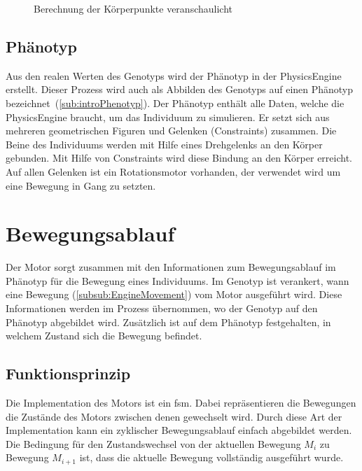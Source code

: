         \begin{figure}[H]
          \centering
          
          \caption{Berechnung der Körperpunkte veranschaulicht\label{fig:kp}}
        \end{figure}

    \subsection{Phänotyp\label{sub:Phenotyp}}

      Aus den realen Werten des Genotyps wird der Phänotyp in der \gls{PhysicsEngine} erstellt.
      Dieser Prozess wird auch als Abbilden des Genotyps auf einen Phänotyp bezeichnet~(\vref{sub:introPhenotyp}).
      Der Phänotyp enthält alle Daten, welche die \gls{PhysicsEngine} braucht, um das Individuum zu simulieren.
      Er setzt sich aus mehreren geometrischen Figuren und Gelenken (\Glspl{Constraint}) zusammen.
      Die Beine des Individuums werden mit Hilfe eines Drehgelenks an den Körper gebunden.
      Mit Hilfe von Constraints wird diese Bindung an den Körper erreicht.
      Auf allen Gelenken ist ein Rotationsmotor vorhanden, der verwendet wird um eine Bewegung in Gang zu setzten.

  \section{Bewegungsablauf\label{sec:Engine}}

    Der Motor sorgt zusammen mit den Informationen zum Bewegungsablauf im Phänotyp für die Bewegung eines Individuums.
    Im Genotyp ist verankert, wann eine Bewegung (\vref{subsub:EngineMovement}) vom Motor ausgeführt wird.
    Diese Informationen werden im Prozess übernommen, wo der Genotyp auf den Phänotyp abgebildet wird.
    Zusätzlich ist auf dem Phänotyp festgehalten, in welchem Zustand sich die Bewegung befindet.

    \subsection{Funktionsprinzip}

      Die Implementation des Motors ist ein \acrfull{fsm}.
      Dabei repräsentieren die Bewegungen die Zustände des Motors zwischen denen gewechselt wird.
      Durch diese Art der Implementation kann ein zyklischer Bewegungsablauf einfach abgebildet werden.
      Die Bedingung für den Zustandswechsel von der aktuellen Bewegung \( M_{i} \) zu Bewegung \( M_{i + 1} \) ist,
      dass die aktuelle Bewegung vollständig ausgeführt wurde.

